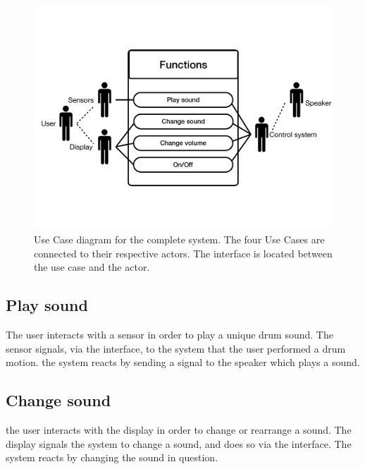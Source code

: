 \begin{figure}[htbp]
\centering
\includegraphics[scale=0.4]{Figure/protoUseCase01.pdf}
\caption{
Use Case diagram for the complete system. The four Use Cases are connected to their respective actors. The interface is located between the use case and the actor.}
\label{fig:protoUseCase}
\end{figure}

\subsection{Play sound}
The user interacts with a sensor in order to play a unique drum sound. The sensor signals, via the interface, to the system that the user performed a drum motion. the system reacts by sending a signal to the speaker which plays a sound.

\subsection{Change sound}
the user interacts with the display in order to change or rearrange a sound. The display signals the system to change a sound, and does so via the interface. The system reacts by changing the sound in question.

